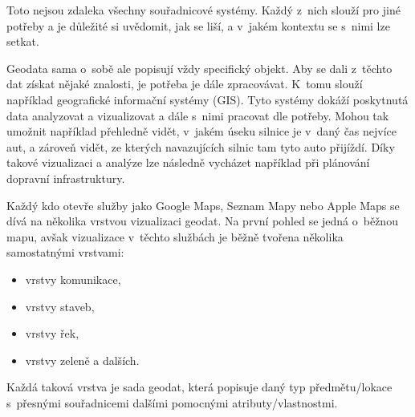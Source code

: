 Toto nejsou zdaleka všechny souřadnicové systémy. Každý z~nich slouží pro jiné potřeby a je důležité si uvědomit, jak se liší, a v~jakém kontextu se s~nimi lze setkat.



Geodata sama o~sobě ale popisují vždy specifický objekt. Aby se dali z~těchto dat získat nějaké znalosti, je potřeba je dále zpracovávat. K~tomu slouží například geografické informační systémy (GIS). Tyto systémy dokáží poskytnutá data analyzovat a vizualizovat a dále s~nimi pracovat dle potřeby. Mohou tak umožnit například přehledně vidět, v~jakém úseku silnice je v~daný čas nejvíce aut, a zároveň vidět, ze kterých navazujících silnic tam tyto auto přijíždí. Díky takové vizualizaci a analýze lze následně vycházet například při plánování dopravní infrastruktury.

Každý kdo otevře služby jako Google Maps, Seznam Mapy nebo Apple Maps se dívá na několika vrstvou vizualizaci geodat. Na první pohled se jedná o~běžnou mapu, avšak vizualizace v~těchto službách je běžně tvořena několika samostatnými vrstvami:

\begin{itemize}
  \item vrstvy komunikace,
  \item vrstvy staveb,
  \item vrstvy řek,
  \item vrstvy zeleně a dalších.
\end{itemize}

Každá taková vrstva je sada geodat, která popisuje daný typ předmětu/lokace s~přesnými souřadnicemi dalšími pomocnými atributy/vlastnostmi.

